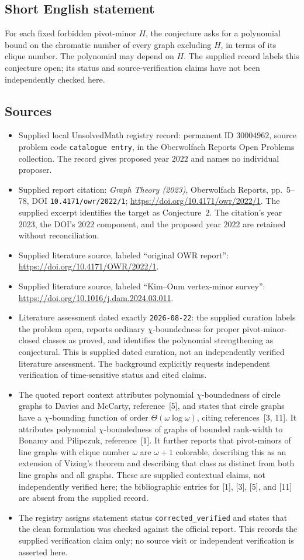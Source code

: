 \documentclass[11pt]{article}
\begin{document}
\subsection{Short English statement}
For each fixed forbidden pivot-minor \(H\), the conjecture asks for a polynomial bound on the chromatic number of every graph excluding \(H\), in terms of its clique number. The polynomial may depend on \(H\). The supplied record labels this conjecture open; its status and source-verification claims have not been independently checked here.
\subsection{Sources}
\begin{itemize}
\item Supplied local UnsolvedMath registry record: permanent ID \(30004962\), source problem code \texttt{catalogue entry}, in the Oberwolfach Reports Open Problems collection. The record gives proposed year \(2022\) and names no individual proposer.
\item Supplied report citation: \emph{Graph Theory (2023)}, Oberwolfach Reports, pp.~5--78, DOI \texttt{10.4171/owr/2022/1}; \url{https://doi.org/10.4171/owr/2022/1}. The supplied excerpt identifies the target as Conjecture~2. The citation's year \(2023\), the DOI's \(2022\) component, and the proposed year \(2022\) are retained without reconciliation.
\item Supplied literature source, labeled ``original OWR report'': \url{https://doi.org/10.4171/OWR/2022/1}.
\item Supplied literature source, labeled ``Kim--Oum vertex-minor survey'': \url{https://doi.org/10.1016/j.dam.2024.03.011}.
\item Literature assessment dated exactly \texttt{2026-08-22}: the supplied curation labels the problem open, reports ordinary \(\chi\)-boundedness for proper pivot-minor-closed classes as proved, and identifies the polynomial strengthening as conjectural. This is supplied dated curation, not an independently verified literature assessment. The background explicitly requests independent verification of time-sensitive status and cited claims.
\item The quoted report context attributes polynomial \(\chi\)-boundedness of circle graphs to Davies and McCarty, reference~[5], and states that circle graphs have a \(\chi\)-bounding function of order \(\Theta(\omega\log\omega)\), citing references~[3, 11]. It attributes polynomial \(\chi\)-boundedness of graphs of bounded rank-width to Bonamy and Pilipczuk, reference~[1]. It further reports that pivot-minors of line graphs with clique number \(\omega\) are \(\omega+1\) colorable, describing this as an extension of Vizing's theorem and describing that class as distinct from both line graphs and all graphs. These are supplied contextual claims, not independently verified here; the bibliographic entries for [1], [3], [5], and [11] are absent from the supplied record.
\item The registry assigns statement status \texttt{corrected\_verified} and states that the clean formulation was checked against the official report. This records the supplied verification claim only; no source visit or independent verification is asserted here.
\end{itemize}
\end{document}
